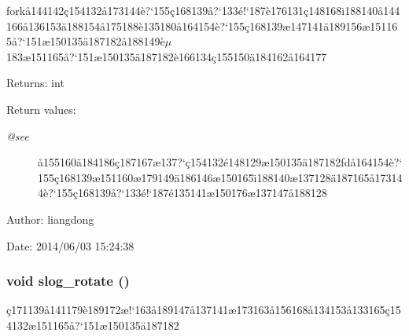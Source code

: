 fork\aa{}144142\c{c}154132\aa{}173144\`{e}?`155\c{c}168139\aa{}?`133\'{e}!`187\`{e}176131\c{c}148168\"{\i}188140\aa{}144166\aa{}136153\"{a}188154\aa{}175188\`{e}135180\aa{}164154\`{e}?`155\c{c}168139\ae{}147141\"{a}189156\ae{}151165\aa{}?`151\ae{}150135\"{a}187182\aa{}188149\`{e}$\mu$183\ae{}151165\aa{}?`151\ae{}150135\"{a}187182\`{e}166134\c{c}155150\"{a}184162\aa{}164177 

\begin{Desc}
\item[Returns:]int \end{Desc}
\begin{Desc}
\item[Return values:]
\begin{description}
\item[{\em @see}]\aa{}155160\"{a}184186\c{c}187167\ae{}137?`\c{c}154132\'{e}148129\ae{}150135\"{a}187182fd\aa{}164154\`{e}?`155\c{c}168139\ae{}151160\ae{}179149\"{a}186146\ae{}150165\"{\i}188140\ae{}137128\"{a}187165\aa{}173144\`{e}?`155\c{c}168139\aa{}?`133\'{e}!`187\'{e}135141\ae{}150176\ae{}137147\aa{}188128 \end{description}
\end{Desc}
\begin{Desc}
\item[Author:]liangdong \end{Desc}
\begin{Desc}
\item[Date:]2014/06/03 15:24:38 \end{Desc}
\subsubsection{\setlength{\rightskip}{0pt plus 5cm}void slog\_\-rotate ()}\label{slog_8h_a12}


\c{c}171139\aa{}141179\`{e}189172\ae{}!`163\aa{}189147\aa{}137141\ae{}173163\aa{}156168\aa{}134153\aa{}133165\c{c}154132\ae{}151165\aa{}?`151\ae{}150135\"{a}187182 

